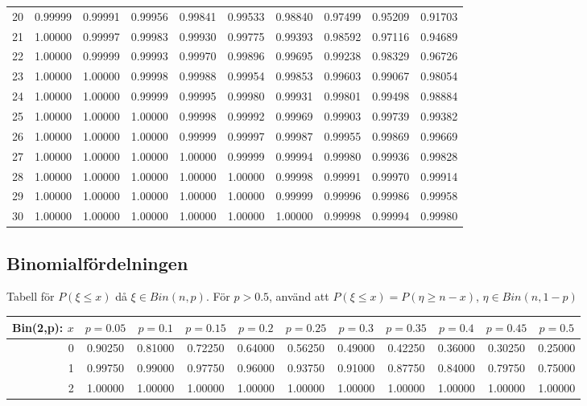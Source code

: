 \begin{tabular}{|r|c|c|c|c|c|c|c|c|c|}
 20&0.99999&0.99991&0.99956&0.99841&0.99533&0.98840&0.97499&0.95209&0.91703\\
 21&1.00000&0.99997&0.99983&0.99930&0.99775&0.99393&0.98592&0.97116&0.94689\\
 22&1.00000&0.99999&0.99993&0.99970&0.99896&0.99695&0.99238&0.98329&0.96726\\
 23&1.00000&1.00000&0.99998&0.99988&0.99954&0.99853&0.99603&0.99067&0.98054\\
 24&1.00000&1.00000&0.99999&0.99995&0.99980&0.99931&0.99801&0.99498&0.98884\\
 25&1.00000&1.00000&1.00000&0.99998&0.99992&0.99969&0.99903&0.99739&0.99382\\
 26&1.00000&1.00000&1.00000&0.99999&0.99997&0.99987&0.99955&0.99869&0.99669\\
 27&1.00000&1.00000&1.00000&1.00000&0.99999&0.99994&0.99980&0.99936&0.99828\\
 28&1.00000&1.00000&1.00000&1.00000&1.00000&0.99998&0.99991&0.99970&0.99914\\
 29&1.00000&1.00000&1.00000&1.00000&1.00000&0.99999&0.99996&0.99986&0.99958\\
 30&1.00000&1.00000&1.00000&1.00000&1.00000&1.00000&0.99998&0.99994&0.99980\\
\hline
\end{tabular}

\vspace{8pt minus 6pt}
\subsection*{Binomialfördelningen}

Tabell för $P(\xi\le x)$ då $\xi\in B in(n,p)$.
För $p>0.5$, använd att $P(\xi\le x)=P(\eta\ge n-x)$,  $\eta\in B in(n,1-p)$

\medskip\begin{tabular}{@{\extracolsep{-2pt}}|r|c|c|c|c|c|c|c|c|c|c|}
\hline
Bin(2,p): $x$
   & $p\!=\!0.05$& $p\!=\!0.1$& $p\!=\!0.15$& $p\!=\!0.2$& $p\!=\!0.25$& $p\!=\!0.3$& $p\!=\!0.35$& $p\!=\!0.4$& $p\!=\!0.45$& $p\!=\!0.5$\\\hline
  0&0.90250&0.81000&0.72250&0.64000&0.56250&0.49000&0.42250&0.36000&0.30250&0.25000\\
  1&0.99750&0.99000&0.97750&0.96000&0.93750&0.91000&0.87750&0.84000&0.79750&0.75000\\
  2&1.00000&1.00000&1.00000&1.00000&1.00000&1.00000&1.00000&1.00000&1.00000&1.00000\\
\hline
\end{tabular}

